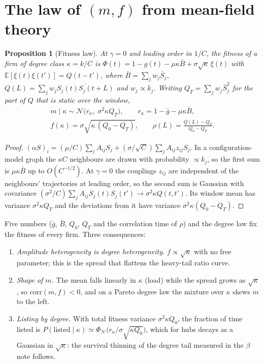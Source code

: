 \documentclass[11pt]{article}
\newcommand{\E}{\mathbb E}
\newtheorem{proposition}{Proposition}
\theoremstyle{remark}
\begin{document}
\section{The law of $(m,f)$ from mean-field theory}
\label{sec:law}

\begin{proposition}[Fitness law]\label{prop:law}
At $\gamma=0$ and leading order in $1/C$, the fitness of a firm of degree class $\kappa=k/C$ is
$\Phi(t)=1-g(t)-\mu\kappa\bar B+\sigma\sqrt\kappa\,\xi(t)$ with $\E[\xi(t)\xi(t')]=Q(t-t')$, where
$\bar B=\sum_jw_j\bar S_j$, $Q(L)=\sum_jw_j\overline{S_j(t)S_j(t+L)}$ and $w_j\propto k_j$.  Writing
$Q_T=\sum_jw_j\bar S_j^2$ for the part of $Q$ that is static over the window,
\begin{gather}
  m\mid\kappa\sim\mathcal N\bigl(r_\kappa,\;\sigma^2\kappa Q_T\bigr),\qquad r_\kappa=1-\bar g-\mu\kappa\bar B,
  \nonumber\\
  f(\kappa)=\sigma\sqrt{\kappa\,(Q_0-Q_T)},\qquad \rho(L)=\frac{Q(L)-Q_T}{Q_0-Q_T}.
  \label{eq:law}
\end{gather}
\end{proposition}
\begin{proof}
$(\alpha S)_i=(\mu/C)\sum_jA_{ij}S_j+(\sigma/\sqrt C)\sum_jA_{ij}z_{ij}S_j$.  In a configuration-model graph the
$\kappa C$ neighbours are drawn with probability $\propto k_j$, so the first sum is $\mu\kappa\bar B$ up to
$O(C^{-1/2})$.  At $\gamma=0$ the couplings $z_{ij}$ are independent of the neighbours' trajectories at leading
order, so the second sum is Gaussian with covariance $(\sigma^2/C)\sum_jA_{ij}S_j(t)S_j(t')\to\sigma^2\kappa Q(t,t')$.
Its window mean has variance $\sigma^2\kappa Q_T$ and the deviations from it have variance $\sigma^2\kappa(Q_0-Q_T)$.
\end{proof}

Five numbers ($\bar g$, $\bar B$, $Q_0$, $Q_T$ and the correlation time of $\rho$) and the degree law fix the
fitness of every firm.  Three consequences:
\begin{enumerate}
  \item \emph{Amplitude heterogeneity is degree heterogeneity.}  $f\propto\sqrt\kappa$ with no free parameter;
        this is the spread that flattens the heavy-tail ratio curve.
  \item \emph{Shape of $m$.}  The mean falls linearly in $\kappa$ (load) while the spread grows as $\sqrt\kappa$, so
        $\mathrm{corr}(m,f)<0$, and on a Pareto degree law the mixture over $\kappa$ skews $m$ to the left.
  \item \emph{Listing by degree.}  With total fitness variance $\sigma^2\kappa Q_0$, the fraction of time listed is
        $P(\text{listed}\mid\kappa)\simeq\Phi_{\mathcal N}\bigl(r_\kappa/\sigma\sqrt{\kappa Q_0}\bigr)$, which for hubs
        decays as a Gaussian in $\sqrt\kappa$: the survival thinning of the degree tail measured in the $\beta$
        note follows.
\end{enumerate}
\end{document}
